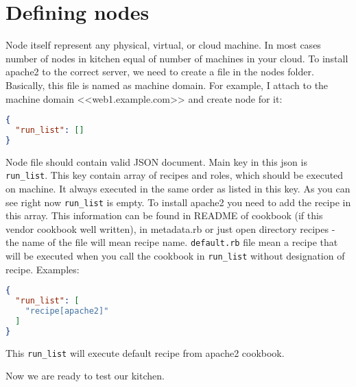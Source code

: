\section{Defining nodes}
\label{sec:solo-node}

Node itself represent any physical, virtual, or cloud machine. In most cases number of nodes in kitchen equal of number of machines in your cloud. To install apache2 to the correct server, we need to create a file in the nodes folder. Basically, this file is named as machine domain. For example, I attach to the machine domain <<web1.example.com>> and create node for it:

\begin{lstlisting}[language=JSON,label=lst:my-cloud-node1,title=my-cloud/nodes/web1.example.com.json]
{
  "run_list": []
}
\end{lstlisting}

Node file should contain valid JSON document. Main key in this json is \lstinline!run_list!. This key contain array of recipes and roles, which should be executed on machine. It always executed in the same order as listed in this key. As you can see right now \lstinline!run_list! is empty. To install apache2 you need to add the recipe in this array. This information can be found in README of cookbook (if this vendor cookbook well written), in metadata.rb or just open directory recipes - the name of the file will mean recipe name. \lstinline!default.rb! file mean a recipe that will be executed when you call the cookbook in \lstinline!run_list! without designation of recipe. Examples:

\begin{lstlisting}[language=JSON,label=lst:my-cloud-node2,title=my-cloud/nodes/web1.example.com.json]
{
  "run_list": [
    "recipe[apache2]"
  ]
}
\end{lstlisting}

This \lstinline!run_list! will execute default recipe from apache2 cookbook.

Now we are ready to test our kitchen.
